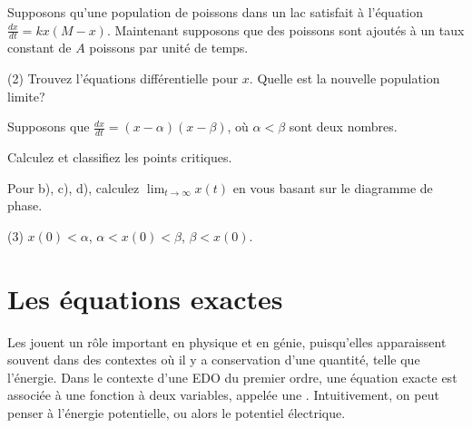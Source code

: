 \begin{exercise}
	Supposons qu'une population de poissons dans un lac satisfait à l'équation 	$\frac{dx}{dt} = kx(M-x)$.
	Maintenant supposons que des poissons sont ajoutés à un taux constant de $A$ poissons par unité de temps.
	\begin{tasks}(2)
		\task Trouvez l'équations différentielle pour $x$.
		\task Quelle est la nouvelle population limite?
	\end{tasks}
\end{exercise}

\begin{exercise}
	Supposons que $\frac{dx}{dt} = (x-\alpha)(x-\beta)$, où $\alpha <
	\beta$ sont deux nombres.
	\begin{tasks}
		\task Calculez et classifiez les points critiques.
	\end{tasks}
	Pour b), c), d), calculez $\displaystyle \lim_{t\to\infty} x(t)$ en vous basant sur le diagramme de phase.
	\begin{tasks}[resume](3)
		\task $x(0) < \alpha$,
		\task $\alpha < x(0) < \beta$,
		\task $\beta < x(0)$.
	\end{tasks}
\end{exercise}


\sectionnewpage
\section{Les équations exactes}
\label{exact:section}

Les \emph{} jouent un rôle important en physique et en génie,
puisqu'elles apparaissent souvent dans des contextes où il y a conservation d'une quantité, telle que l'énergie.
Dans le contexte d'une EDO du premier ordre, une équation exacte est associée à une fonction à deux variables,
appelée une \emph{}.
Intuitivement, on peut penser à l'énergie potentielle, ou alors le potentiel électrique.

